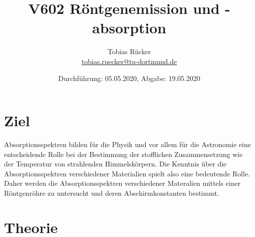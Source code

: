 


    \title{V602 Röntgenemission und -absorption}
    \author{  
    Tobias Rücker\\
    \texorpdfstring{\href{mailto:tobias.ruecker@tu-dortmund.de}{tobias.ruecker@tu-dortmund.de}
    }{}}
    \date{Durchführung: 05.05.2020, Abgabe: 19.05.2020 \vspace{-4ex}}
\maketitle
\thispagestyle{empty}

\newpage
\tableofcontents
\thispagestyle{empty}
\newpage


\setcounter{page}{1}
\section{Ziel}\justifying
Absorptionsspektren bilden für die Physik und vor allem für die Astronomie eine entscheidende Rolle
bei der Bestimmung der stofflichen Zusammensetzung wie der Temperatur von strahlenden Himmelskörpern.
Die Kenntnis über die Absorptionsspektren verschiedener Materialien spielt also eine bedeutende
Rolle. Daher werden die Absorptionsspektren verschiedener Materalien mittels einer Röntgenröhre zu
untersucht und deren Abschirmkonstanten bestimmt. 



\section{Theorie}\justifying

